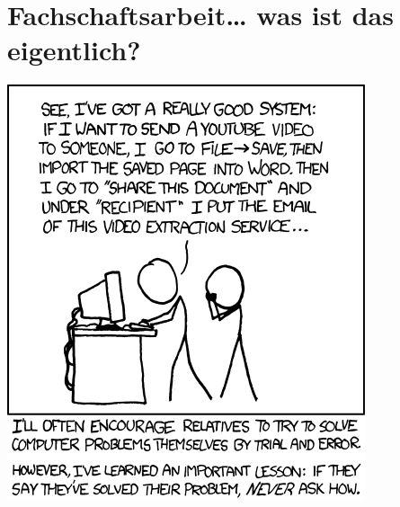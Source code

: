 \documentclass[a4paper,12pt]{scrartcl}
\newcommand{\spaltenanfang}{\begin{multicols}{2}}
\newcommand{\spaltenende}{\end{multicols}}
\begin{document}

\section{Fachschaftsarbeit… was ist das eigentlich?}

\label{fachschaftsarbeit}

\spaltenanfang

\spaltenende

\vspace{20mm}
\begin{center}
	\includegraphics[scale=1.0]{comics/workaround}
\end{center}

\newpage



\end{document}
